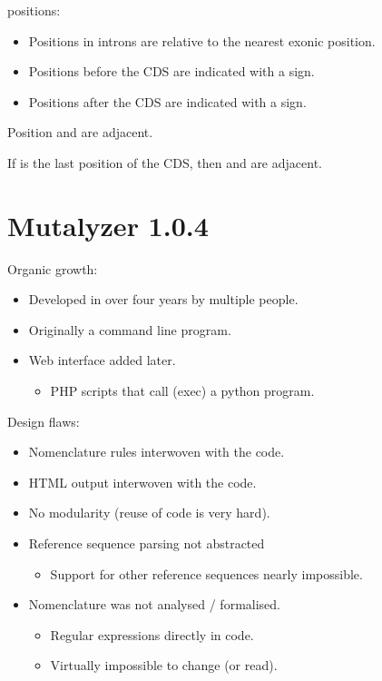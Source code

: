 \documentclass[slidestop]{beamer}
\begin{document}
\begin{frame}
  \positionpicture

   positions:
  \bigskip
  \begin{itemize}
    \item Positions in introns are relative to the nearest exonic position.
    \item Positions before the CDS are indicated with a \bt{-} sign.
    \item Positions after the CDS are indicated with a \bt{*} sign.
  \end{itemize}

  \pause
  \bigskip
  Position  and  are adjacent.

  If  is the last position of the CDS, then  and  are
  adjacent.
\end{frame}

\section{Mutalyzer 1.0.4}
\begin{frame}
  Organic growth:
  \begin{itemize}
    \item Developed in over four years by multiple people.
    \item Originally a command line program.
    \item Web interface added later.
    \begin{itemize}
      \item PHP scripts that call (exec) a python program.
    \end{itemize}
  \end{itemize}
  \bigskip
  \pause

  Design flaws:
  \begin{itemize}
    \item Nomenclature rules interwoven with the code.
    \item HTML output interwoven with the code.
    \item No modularity (reuse of code is very hard).
    \item Reference sequence parsing not abstracted 
    \begin{itemize}
      \item Support for other reference sequences nearly impossible.
    \end{itemize}
    \item Nomenclature was not analysed / formalised.
    \begin{itemize}
      \item Regular expressions directly in code.
      \item Virtually impossible to change (or read).
    \end{itemize}
  \end{itemize}
\end{frame}
\end{document}
